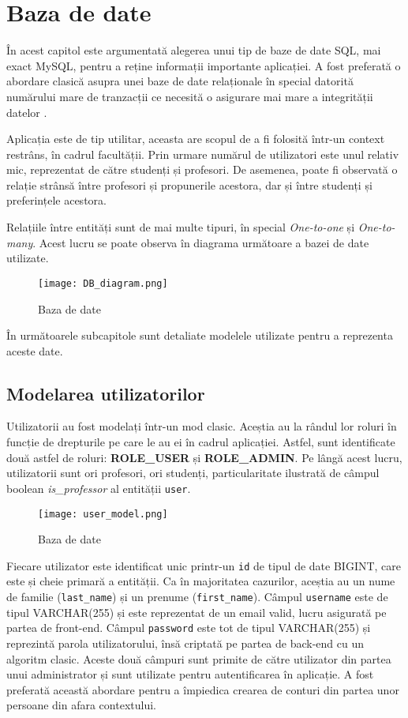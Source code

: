 \chapter{Baza de date}

În acest capitol este argumentată alegerea unui tip de baze de date SQL, mai exact MySQL, pentru a reține informații importante aplicației. A fost preferată o abordare clasică asupra unei baze de date relaționale în special datorită numărului mare de tranzacții ce necesită o asigurare mai mare a integrității datelor \cite{sql1}.

Aplicația \thesistitle este de tip utilitar, aceasta are scopul de a fi folosită într-un context restrâns, în cadrul facultății. Prin urmare numărul de utilizatori este unul relativ mic, reprezentat de către studenți și profesori. De asemenea, poate fi observată o relație strânsă între profesori și propunerile acestora, dar și între studenți și preferințele acestora.

Relațiile între entități sunt de mai multe tipuri, în special \textit{One-to-one} și \textit{One-to-many}. Acest lucru se poate observa în diagrama următoare a bazei de date utilizate.

\begin{figure}[H]
	\centering
	\texttt{[image: DB\_diagram.png]}
	\caption{Baza de date}
\end{figure}

În următoarele subcapitole sunt detaliate modelele utilizate pentru a reprezenta aceste date.

\section{Modelarea utilizatorilor}

Utilizatorii au fost modelați într-un mod clasic. Aceștia au la rândul lor roluri în funcție de drepturile pe care le au ei în cadrul aplicației. Astfel, sunt identificate două astfel de roluri: \textbf{ROLE\_USER} și \textbf{ROLE\_ADMIN}. Pe lângă acest lucru, utilizatorii sunt ori profesori, ori studenți, particularitate ilustrată de câmpul boolean \textit{is\_professor} al entității \texttt{user}.

\begin{figure}[H]
	\centering
	\texttt{[image: user\_model.png]}
	\caption{Baza de date}
\end{figure}

Fiecare utilizator este identificat unic printr-un \texttt{id} de tipul de date BIGINT, care este și cheie primară a entității. Ca în majoritatea cazurilor, aceștia au un nume de familie (\texttt{last\_name}) și un prenume (\texttt{first\_name}). Câmpul \texttt{username} este de tipul VARCHAR(255) și este reprezentat de un email valid, lucru asigurată pe partea de front-end. Câmpul \texttt{password} este tot de tipul VARCHAR(255) și reprezintă parola utilizatorului, însă criptată pe partea de back-end cu un algoritm clasic.
Aceste două câmpuri sunt primite de către utilizator din partea unui administrator și sunt utilizate pentru autentificarea în aplicație. A fost preferată această abordare pentru a împiedica crearea de conturi din partea unor persoane din afara contextului.

